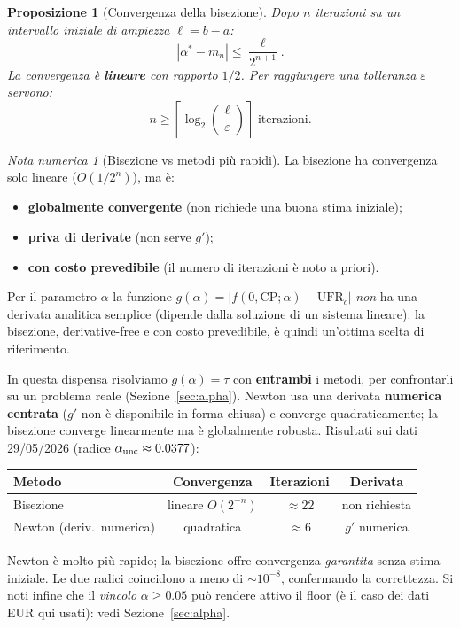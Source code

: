 \documentclass[11pt,a4paper]{article}
\theoremstyle{plain}
\newtheorem{proposizione}[teorema]{Proposizione}
\theoremstyle{definition}
\theoremstyle{remark}
\newtheorem*{attenzione}{Nota numerica}
\newcommand{\UFR}{\mathrm{UFR}}
\newcommand{\CP}{\mathrm{CP}}
\newcommand{\abs}[1]{\left\lvert #1 \right\rvert}
\begin{document}
\begin{proposizione}[Convergenza della bisezione]
\label{prop:bisez}
Dopo $n$ iterazioni su un intervallo iniziale di ampiezza $\ell = b-a$:
\begin{equation}
  \label{eq:bisez_err}
  \abs{\alpha^* - m_n} \le \frac{\ell}{2^{n+1}}.
\end{equation}
La convergenza \`e \textbf{lineare} con rapporto $1/2$. Per raggiungere una
tolleranza $\varepsilon$ servono:
\begin{equation}
  \label{eq:bisez_iter}
  n \ge \left\lceil \log_2\!\left(\frac{\ell}{\varepsilon}\right) \right\rceil
  \text{ iterazioni.}
\end{equation}
\end{proposizione}

\begin{attenzione}[Bisezione vs metodi pi\`u rapidi]
La bisezione ha convergenza solo lineare ($O(1/2^n)$), ma \`e:
\begin{itemize}
  \item \textbf{globalmente convergente} (non richiede una buona stima iniziale);
  \item \textbf{priva di derivate} (non serve $g'$);
  \item \textbf{con costo prevedibile} (il numero di iterazioni \`e noto a priori).
\end{itemize}
Per il parametro $\alpha$ la funzione $g(\alpha) = \abs{f(0,\CP;\alpha) - \UFR_c}$
\emph{non} ha una derivata analitica semplice (dipende dalla soluzione di un sistema
lineare): la bisezione, derivative-free e con costo prevedibile, è quindi un'ottima
scelta di riferimento.
\end{attenzione}

\begin{keybox}
In questa dispensa risolviamo $g(\alpha)=\tau$ con \textbf{entrambi} i metodi,
per confrontarli su un problema reale (Sezione~\ref{sec:alpha}). Newton usa una
derivata \textbf{numerica centrata} ($g'$ non è disponibile in forma chiusa) e
converge quadraticamente; la bisezione converge linearmente ma è globalmente
robusta. Risultati sui dati 29/05/2026 (radice $\alpha_{\rm unc}\approx 0.0377$):
\begin{center}\small
\renewcommand{\arraystretch}{1.2}
\begin{tabular}{lccc}
\toprule
\textbf{Metodo} & \textbf{Convergenza} & \textbf{Iterazioni} & \textbf{Derivata}\\
\midrule
Bisezione & lineare $O(2^{-n})$ & $\approx 22$ & non richiesta\\
Newton (deriv.\ numerica) & quadratica & $\approx 6$ & $g'$ numerica\\
\bottomrule
\end{tabular}
\end{center}
Newton è molto più rapido; la bisezione offre convergenza \emph{garantita} senza
stima iniziale. Le due radici coincidono a meno di $\sim 10^{-8}$, confermando la
correttezza. Si noti infine che il \emph{vincolo} $\alpha\ge 0.05$ può rendere
attivo il floor (è il caso dei dati EUR qui usati): vedi Sezione~\ref{sec:alpha}.
\end{keybox}
\end{document}
